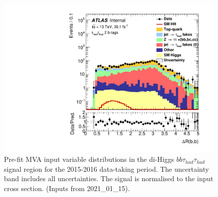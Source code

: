 \begin{figure}
\includegraphics[width=.45\textwidth]{figures/selection/HadHad_HH/Plots2015/Region_BMin0_incJet1_distdRBB_J2_Y2015_DLLOS_T2_SpcTauHH_L0_Prefitlog.pdf}
\caption{Pre-fit MVA input variable distributions in the di-Higgs
  $bb\tau_{had}\tau_{had}$ signal region for the 2015-2016 data-taking period. The uncertainty band includes all uncertainties. The signal is normalised to the input cross section. (Inputs from 2021\_01\_15).}
\label{fig:HadHadPreselectionPNNInputsDistributions2015}
\end{figure}

